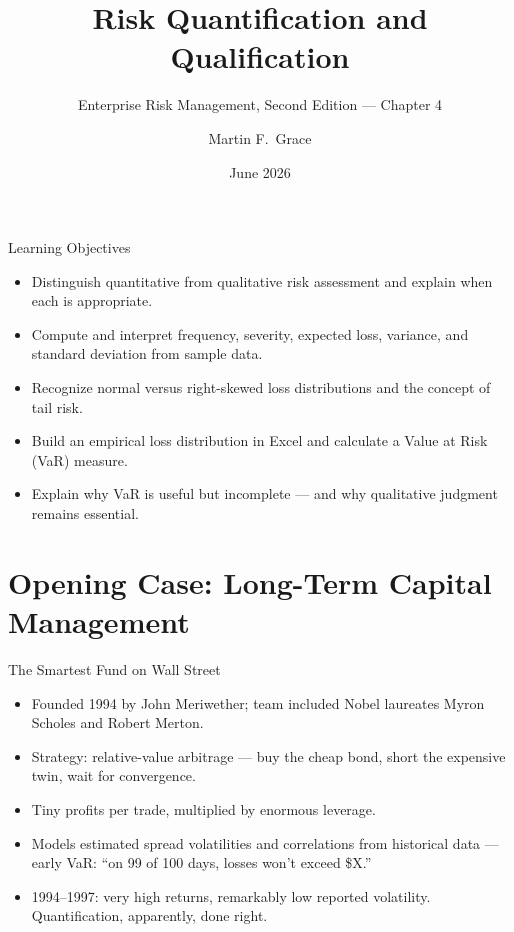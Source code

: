\documentclass[11pt, aspectratio=169]{beamer}
\title[ERM Ch.\,4]{Risk Quantification and Qualification}
\subtitle{Enterprise Risk Management, Second Edition --- Chapter 4}
\author{Martin F.\ Grace}
\institute{University of Iowa\\[2pt] Tippie College of Business\\[2pt] Vaughan Institute of Risk Management}
\date{June 2026}
\begin{document}
\begin{frame}[plain]
\titlepage
\end{frame}

\begin{frame}{Learning Objectives}
\begin{itemize}
  \item Distinguish \alert{quantitative} from \alert{qualitative} risk assessment and explain when each is appropriate.
  \item Compute and interpret frequency, severity, expected loss, variance, and standard deviation from sample data.
  \item Recognize normal versus \alert{right-skewed} loss distributions and the concept of tail risk.
  \item Build an empirical loss distribution in Excel and calculate a \alert{Value at Risk (VaR)} measure.
  \item Explain why VaR is useful but incomplete --- and why qualitative judgment remains essential.
\end{itemize}
\end{frame}

\section{Opening Case: Long-Term Capital Management}

\begin{frame}{The Smartest Fund on Wall Street}
\begin{itemize}
  \item Founded 1994 by John Meriwether; team included Nobel laureates Myron Scholes and Robert Merton.
  \item Strategy: \alert{relative-value arbitrage} --- buy the cheap bond, short the expensive twin, wait for convergence.
  \item Tiny profits per trade, multiplied by \alert{enormous leverage}.
  \item Models estimated spread volatilities and correlations from historical data --- early VaR: ``on 99 of 100 days, losses won't exceed \$X.''
  \item 1994--1997: very high returns, remarkably low reported volatility. Quantification, apparently, done right.
\end{itemize}
\end{frame}
\end{document}
